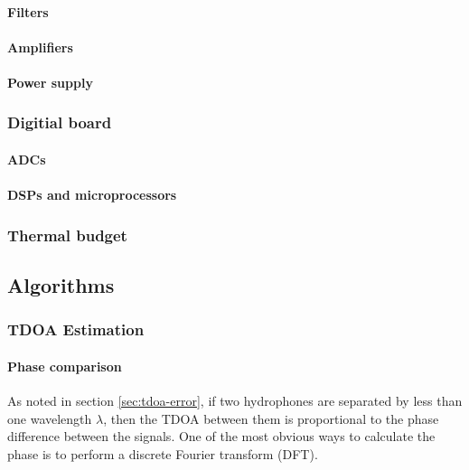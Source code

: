 \documentclass[10pt]{article}
\begin{document}
\paragraph{Filters}

\paragraph{Amplifiers}

\paragraph{Power supply}

\subsubsection{Digitial board}

\paragraph{ADCs}

\paragraph{DSPs and microprocessors}

\subsubsection{Thermal budget}

\subsection{Algorithms}

\subsubsection{TDOA Estimation}

\paragraph{Phase comparison}

As noted in section \ref{sec:tdoa-error}, if two hydrophones are separated by less than one  wavelength \(\lambda\), then the TDOA between them is proportional to the phase difference between the signals.  One of the most obvious ways to calculate the phase is to perform a discrete Fourier transform (DFT).
\end{document}
